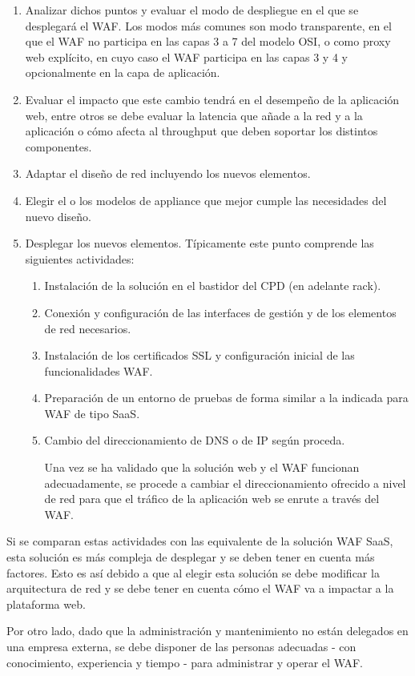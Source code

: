 \begin{enumerate}
  \item Analizar dichos puntos y evaluar el modo de despliegue en el que se desplegará el WAF. Los modos más comunes son modo transparente, en
    el que el WAF no participa en las capas 3 a 7 del modelo OSI, o como proxy web explícito, en cuyo caso el WAF participa en las capas 3 y 4
    y opcionalmente en la capa de aplicación.
  \item Evaluar el impacto que este cambio tendrá en el desempeño de la aplicación web, entre otros se debe evaluar la latencia que añade a la
    red y a la aplicación o cómo afecta al throughput que deben soportar los distintos componentes.
  \item Adaptar el diseño de red incluyendo los nuevos elementos.
  \item Elegir el o los modelos de appliance que mejor cumple las necesidades del nuevo diseño.
  \item Desplegar los nuevos elementos. Típicamente este punto comprende las siguientes actividades:
    \begin{enumerate}
      \item Instalación de la solución en el bastidor del CPD (en adelante rack).
      \item Conexión y configuración de las interfaces de gestión y de los elementos de red necesarios.
      \item Instalación de los certificados SSL y configuración inicial de las funcionalidades WAF.
      \item Preparación de un entorno de pruebas de forma similar a la indicada para WAF de tipo SaaS.
      \item Cambio del direccionamiento de DNS o de IP según proceda.
        \par Una vez se ha validado que la solución web y el WAF funcionan adecuadamente, se procede a cambiar el direccionamiento ofrecido a nivel
        de red para que el tráfico de la aplicación web se enrute a través del WAF.
    \end{enumerate}
\end{enumerate}

\par Si se comparan estas actividades con las equivalente de la solución WAF SaaS, esta solución es más compleja de desplegar y se deben tener
en cuenta más factores. Esto es así debido a que al elegir esta solución se debe modificar la arquitectura de red y se debe tener en cuenta
cómo el WAF va a impactar a la plataforma web.
\par Por otro lado, dado que la administración y mantenimiento no están delegados en una empresa externa, se debe disponer de las personas
adecuadas - con conocimiento, experiencia y tiempo - para administrar y operar el WAF.

